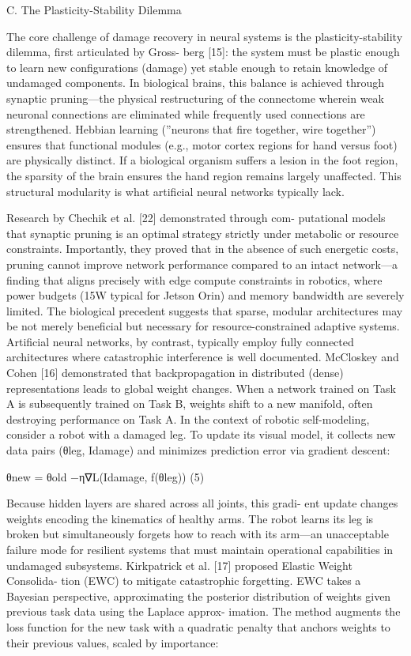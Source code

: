 \documentclass[10pt,twocolumn,letterpaper]{article}
\begin{document}
C. The Plasticity-Stability Dilemma

The core challenge of damage recovery in neural systems is the plasticity-stability dilemma, first articulated by Gross- berg [15]: the system must be plastic enough to learn new configurations (damage) yet stable enough to retain knowledge of undamaged components. In biological brains, this balance is achieved through synaptic pruning—the physical restructuring of the connectome wherein weak neuronal connections are eliminated while frequently used connections are strengthened. Hebbian learning (”neurons that fire together, wire together”) ensures that functional modules (e.g., motor cortex regions for hand versus foot) are physically distinct. If a biological organism suffers a lesion in the foot region, the sparsity of the brain ensures the hand region remains largely unaffected. This structural modularity is what artificial neural networks typically lack.

Research by Chechik et al. [22] demonstrated through com- putational models that synaptic pruning is an optimal strategy strictly under metabolic or resource constraints. Importantly, they proved that in the absence of such energetic costs, pruning cannot improve network performance compared to an intact network—a finding that aligns precisely with edge compute constraints in robotics, where power budgets (15W typical for Jetson Orin) and memory bandwidth are severely limited. The biological precedent suggests that sparse, modular architectures may be not merely beneficial but necessary for resource-constrained adaptive systems. Artificial neural networks, by contrast, typically employ fully connected architectures where catastrophic interference is well documented. McCloskey and Cohen [16] demonstrated that backpropagation in distributed (dense) representations leads to global weight changes. When a network trained on Task A is subsequently trained on Task B, weights shift to a new manifold, often destroying performance on Task A. In the context of robotic self-modeling, consider a robot with a damaged leg. To update its visual model, it collects new data pairs (θleg, Idamage) and minimizes prediction error via gradient descent:

θnew = θold −η∇L(Idamage, f(θleg)) (5)

Because hidden layers are shared across all joints, this gradi- ent update changes weights encoding the kinematics of healthy arms. The robot learns its leg is broken but simultaneously forgets how to reach with its arm—an unacceptable failure mode for resilient systems that must maintain operational capabilities in undamaged subsystems. Kirkpatrick et al. [17] proposed Elastic Weight Consolida- tion (EWC) to mitigate catastrophic forgetting. EWC takes a Bayesian perspective, approximating the posterior distribution of weights given previous task data using the Laplace approx- imation. The method augments the loss function for the new task with a quadratic penalty that anchors weights to their previous values, scaled by importance:
\end{document}
